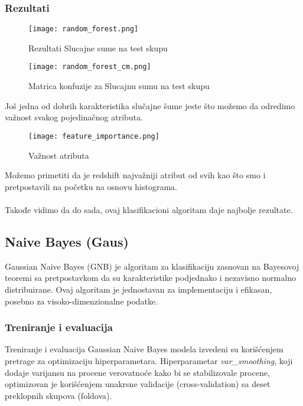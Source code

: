 \documentclass[a4paper,12pt]{article}
\begin{document}
\subsubsection{Rezultati}

\begin{figure}[H]
\centering
\texttt{[image: random\_forest.png]}
\caption{Rezultati Slucajne sume na test skupu}
\label{fig:random_forest}
\end{figure}

\begin{figure}[H]
\centering
\texttt{[image: random\_forest\_cm.png]}
\caption{Matrica konfuzije za Slucajnu sumu na test skupu}
\label{fig:random_forest_cm}
\end{figure}

Još jedna od dobrih karakteristika slučajne šume jeste što možemo da odredimo važnost svakog pojedinačnog atributa.

\begin{figure}[H]
    \centering
    \texttt{[image: feature\_importance.png]}
    \caption{Važnost atributa}
    \label{fig:feature_importance}
\end{figure}

Možemo primetiti da je redshift najvažniji atribut od svih kao što smo i pretpostavili na početku na osnovu histograma.
\\\\Takođe vidimo da do sada, ovaj klasifikacioni algoritam daje najbolje rezultate.

\subsection{Naive Bayes (Gaus)}
Gaussian Naive Bayes (GNB) je algoritam za klasifikaciju zasnovan na Bayesovoj teoremi sa pretpostavkom da su karakteristike podjednako i nezavisno normalno distribuirane. Ovaj algoritam je jednostavan za implementaciju i efikasan, posebno za visoko-dimenzionalne podatke.

\subsubsection{Treniranje i evaluacija}
Treniranje i evaluacija Gaussian Naive Bayes modela izvedeni su korišćenjem pretrage za optimizaciju hiperparametara. Hiperparametar \textit{var\_smoothing}, koji dodaje varijansu na procene verovatnoće kako bi se stabilizovale procene, optimizovan je korišćenjem unakrsne validacije (cross-validation) sa deset preklopnih skupova (foldova).
\end{document}
